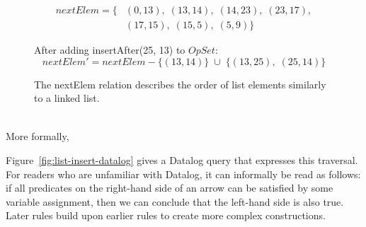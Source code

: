 \begin{figure}
\begin{align*}
\mathit{nextElem} = \{ &
   (0, 13),\; (13, 14),\; (14, 23),\; (23, 17),\\ &
   (17, 15),\; (15, 5),\; (5, 9) \}
\end{align*}
\centering
{}
\vskip 18pt
After adding insertAfter(25, 13) to $\mathit{OpSet}$:
\[ \mathit{nextElem}' = \mathit{nextElem} - \{(13, 14)\} \;\cup\; \{(13, 25),\; (25, 14)\} \]
\caption{The nextElem relation describes the order of list elements similarly to a linked list.}\label{fig:next-elem}
\end{figure}

\begin{figure*}
\begin{align*}

\end{align*}
\caption{Datalog rules for an ordered list (insertion only).}\label{fig:list-insert-datalog}
\end{figure*}

More formally, 

Figure~\ref{fig:list-insert-datalog} gives a Datalog query that expresses this traversal.
For readers who are unfamiliar with Datalog, it can informally be read as follows: if all predicates on the right-hand side of an arrow can be satisfied by some variable assignment, then we can conclude that the left-hand side is also true.
Later rules build upon earlier rules to create more complex constructions.

\begin{figure*}
\centering

\caption{RGA example}\label{fig.two-lists}
\end{figure*}
